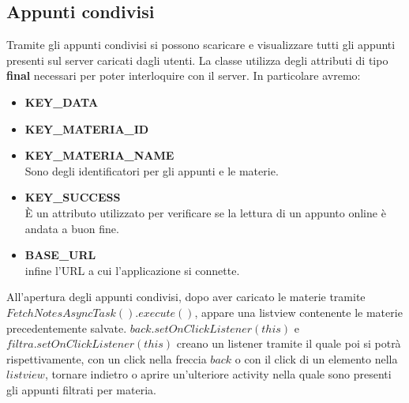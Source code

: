 \documentclass[a4paper, 50pt, twoside]{article}
\begin{document}
\newpage
\subsection{Appunti condivisi}
Tramite gli appunti condivisi si possono scaricare e visualizzare tutti gli appunti presenti sul server caricati dagli utenti. La classe utilizza degli attributi di tipo \textbf{final} necessari per poter interloquire con il server. In particolare avremo:\\
\begin{itemize}
\item \textbf{KEY\_DATA}
\item \textbf{KEY\_MATERIA\_ID}
\item \textbf{KEY\_MATERIA\_NAME}
\\Sono degli identificatori per gli appunti e le materie.\\
\item  \textbf{KEY\_SUCCESS}
\\È un attributo utilizzato per verificare se la lettura di un appunto online è andata a buon fine.
\item \textbf{BASE\_URL}
\\infine l'URL a cui l'applicazione si connette.
\end{itemize}
 All'apertura degli appunti condivisi, dopo aver caricato le materie tramite $FetchNotesAsyncTask().execute()$, appare una listview contenente le materie precedentemente salvate. $back.setOnClickListener(this)$ e $filtra.setOnClickListener(this)$ creano un listener tramite il quale poi si potrà rispettivamente, con  un click nella freccia \textbf{$back$} o con il click di un elemento nella $listview$, tornare indietro o aprire un'ulteriore activity nella quale sono presenti gli appunti filtrati per materia.
\end{document}
